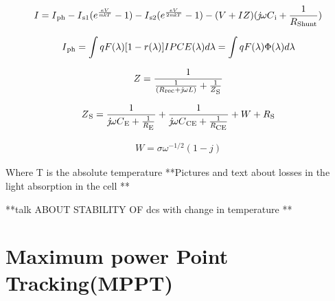 { \begin{equation}
  \begin{aligned}
    I = I\textsubscript{ph} -  I\textsubscript{s1} (e^{\frac{eV}{\textit{mk}T}}-1) - I\textsubscript{s2} (e^{\frac{eV}{2\textit{mk}T}}-1)- (V+IZ)(\textit{j}{\omega}C\textsubscript{i}+\frac{1}{R\textsubscript{Shunt}}) 
     \label{eq:equ_current_dSC}
  \end{aligned}
 \end{equation}
    
 \begin{equation}
  \begin{aligned}
     I\textsubscript{ph} =\int{qF(\lambda)[1-r(\lambda)]IPCE(\lambda)d\lambda} = \int{qF(\lambda)\Phi(\lambda)d\lambda}  
  \end{aligned}
 \end{equation}
 
  \begin{equation}
   \begin{aligned}
     Z={\dfrac{1}{{\frac{1}{(R\textsubscript{rec}+\textit{j}{\omega}L)}}+{\frac{1}{Z\textsubscript{S}}}}} 
   \end{aligned}
  \end{equation}
  
 \begin{equation}
   \begin{aligned}
    Z\textsubscript{S}={\dfrac{1}{{\textit{j}{\omega}C\textsubscript{E}}+{\frac{1}{R\textsubscript{E}}}}}+{\dfrac{1}{{\textit{j}{\omega}C\textsubscript{CE}}+{\frac{1}{R\textsubscript{CE}}}}}+W+R\textsubscript{S}
   \end{aligned}
  \end{equation}
  
   \begin{equation}
     \begin{aligned}
     W = \sigma{\omega^{-1/2}}(1-\textit{j})
     \end{aligned}
    \end{equation}
    
Where T is the absolute temperature 
**Pictures and text about losses in the light absorption in the cell **

**talk ABOUT STABILITY OF dcs with change in temperature **

\section{Maximum power Point Tracking(MPPT)}

}
